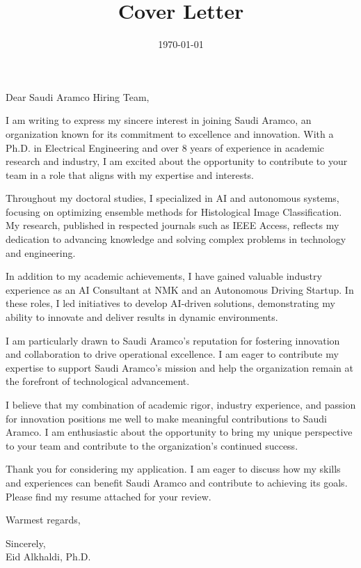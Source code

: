 \documentclass[11pt]{article}
\date{\today}
\title{Cover Letter}
\begin{document}
\maketitle
\noindent
Dear Saudi Aramco Hiring Team,
\indent

I am writing to express my sincere interest in joining Saudi Aramco, an organization known for its commitment to excellence and innovation. With a Ph.D. in Electrical Engineering and over 8 years of experience in academic research and industry, I am excited about the opportunity to contribute to your team in a role that aligns with my expertise and interests.

Throughout my doctoral studies, I specialized in AI and autonomous systems, focusing on optimizing ensemble methods for Histological Image Classification. My research, published in respected journals such as IEEE Access, reflects my dedication to advancing knowledge and solving complex problems in technology and engineering.

In addition to my academic achievements, I have gained valuable industry experience as an AI Consultant at NMK and an Autonomous Driving Startup. In these roles, I led initiatives to develop AI-driven solutions, demonstrating my ability to innovate and deliver results in dynamic environments.

I am particularly drawn to Saudi Aramco's reputation for fostering innovation and collaboration to drive operational excellence. I am eager to contribute my expertise to support Saudi Aramco's mission and help the organization remain at the forefront of technological advancement.

I believe that my combination of academic rigor, industry experience, and passion for innovation positions me well to make meaningful contributions to Saudi Aramco. I am enthusiastic about the opportunity to bring my unique perspective to your team and contribute to the organization's continued success.

Thank you for considering my application. I am eager to discuss how my skills and experiences can benefit Saudi Aramco and contribute to achieving its goals. Please find my resume attached for your review.

Warmest regards,

\noindent
Sincerely,\\[0pt]
Eid Alkhaldi, Ph.D.
\end{document}
